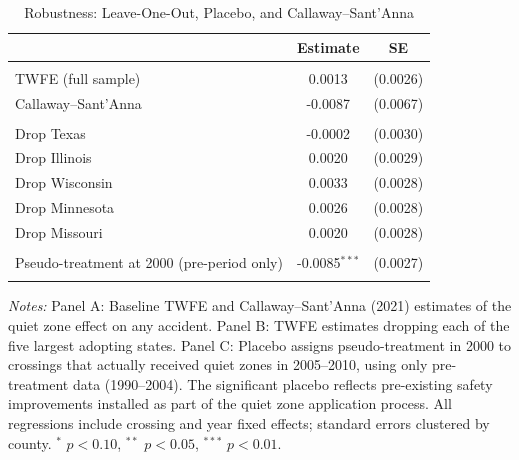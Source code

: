 \begin{table}[t]
\centering
\caption{Robustness: Leave-One-Out, Placebo, and Callaway--Sant'Anna}
\label{tab:robustness}
\begin{threeparttable}
\begin{tabular}{lcc}
\hline\hline
 & Estimate & SE \\
\hline
\addlinespace
\multicolumn{3}{l}{\textit{Panel A: Baseline}} \\
\addlinespace
TWFE (full sample) & 0.0013 & (0.0026) \\
Callaway--Sant'Anna & -0.0087 & (0.0067) \\
\addlinespace
\multicolumn{3}{l}{\textit{Panel B: Leave-One-Out by State}} \\
\addlinespace
\quad Drop Texas & -0.0002 & (0.0030) \\
\quad Drop Illinois & 0.0020 & (0.0029) \\
\quad Drop Wisconsin & 0.0033 & (0.0028) \\
\quad Drop Minnesota & 0.0026 & (0.0028) \\
\quad Drop Missouri & 0.0020 & (0.0028) \\
\addlinespace
\multicolumn{3}{l}{\textit{Panel C: Placebo}} \\
\addlinespace
Pseudo-treatment at 2000 (pre-period only) & -0.0085$^{***}$ & (0.0027) \\
\addlinespace
\hline\hline
\end{tabular}
\begin{tablenotes}[flushleft]
\small
\item \textit{Notes:} Panel A: Baseline TWFE and Callaway--Sant'Anna (2021) estimates of the quiet zone effect on any accident. Panel B: TWFE estimates dropping each of the five largest adopting states. Panel C: Placebo assigns pseudo-treatment in 2000 to crossings that actually received quiet zones in 2005--2010, using only pre-treatment data (1990--2004). The significant placebo reflects pre-existing safety improvements installed as part of the quiet zone application process. All regressions include crossing and year fixed effects; standard errors clustered by county. $^{*}$ $p < 0.10$, $^{**}$ $p < 0.05$, $^{***}$ $p < 0.01$.
\end{tablenotes}
\end{threeparttable}
\end{table}
